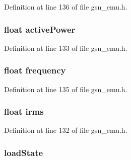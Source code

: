 Definition at line 136 of file gsn\_\-emu.h.

\hypertarget{a00060_aabf327ff94458c4f133aec441d0de13c}{
\subsubsection[{activePower}]{\setlength{\rightskip}{0pt plus 5cm}float {\bf activePower}}}
\label{a00060_aabf327ff94458c4f133aec441d0de13c}


Definition at line 133 of file gsn\_\-emu.h.

\hypertarget{a00060_acdfc8898c9e67fbcec81f3b04ae61bd9}{
\subsubsection[{frequency}]{\setlength{\rightskip}{0pt plus 5cm}float {\bf frequency}}}
\label{a00060_acdfc8898c9e67fbcec81f3b04ae61bd9}


Definition at line 135 of file gsn\_\-emu.h.

\hypertarget{a00060_af9b0db3f42bdf3f755afe229084986a8}{
\subsubsection[{irms}]{\setlength{\rightskip}{0pt plus 5cm}float {\bf irms}}}
\label{a00060_af9b0db3f42bdf3f755afe229084986a8}


Definition at line 132 of file gsn\_\-emu.h.

\hypertarget{a00060_ac85c98c5028bc52183b644943b10a682}{
\subsubsection[{loadState}]{ {\bf loadState}}}
\label{a00060_ac85c98c5028bc52183b644943b10a682}


